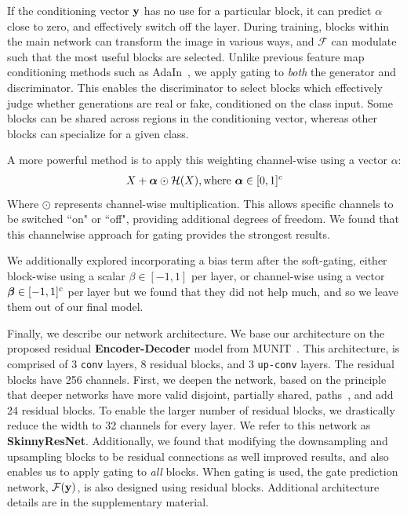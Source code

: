 If the conditioning vector ${\bf y}$ has no use for a particular block, it can predict $\alpha$ close to zero, and effectively switch off the layer.
During training, blocks within the main network can transform the image in various ways, and $\mathcal{F}$ can modulate such that the most useful blocks are selected. 
Unlike previous feature map conditioning methods such as AdaIn~\cite{ulyanovinstance}, we apply gating to \emph{both} the generator and discriminator. 
This enables the discriminator to select blocks which effectively judge whether generations are real or fake, conditioned on the class input.
Some blocks can be shared across regions in the conditioning vector, whereas other blocks can specialize for a given class.

A more powerful method is to apply this weighting channel-wise using a vector {\boldmath$\alpha$}: %
\begin{align}
X + \mbox{\boldmath $\alpha$} \odot \mathcal{H}(X), \text{where } \mbox{\boldmath $\alpha$} \in [0,1]^c 
\end{align}
Where $\odot$ represents channel-wise multiplication. This allows specific channels to be switched ``on" or ``off", providing additional degrees of freedom.
We found that this channelwise approach for gating provides the strongest results. 

We additionally explored incorporating a bias term after the soft-gating, either block-wise using a scalar $\beta \in [-1,1]$ per layer, or channel-wise using a vector $\mbox{\boldmath $\beta$} \in [-1, 1]^c$ per layer but we found that they did not help much, and so we leave them out of our final model.




Finally, we describe our network architecture. 
We base our architecture on the proposed residual \textbf{Encoder-Decoder} model from MUNIT~\cite{huang2018multimodal}.
This architecture, is comprised of 3 \texttt{conv} layers, 8 residual blocks, and 3 \texttt{up-conv} layers. The residual blocks have 256 channels. 
First, we deepen the network, based on the principle that deeper networks have more valid disjoint, partially shared, paths~\cite{veit2016residual}, and add 24 residual blocks. 
To enable the larger number of residual blocks, we drastically reduce the width to 32 channels for every layer. 
We refer to this network as \textbf{SkinnyResNet}. 
Additionally, we found that modifying the downsampling and upsampling blocks to be residual connections as well improved results, and also enables us to apply gating to {\em all} blocks. 
When gating is used, the gate prediction network, $\mathcal{F} ({\bf y})$,  
is also designed using residual blocks. Additional architecture details are in the supplementary material. 

